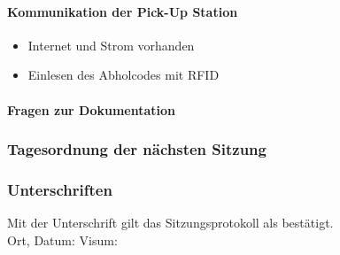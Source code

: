 \paragraph{Kommunikation der Pick-Up Station}
	\begin{itemize}
	\item Internet und Strom vorhanden
	\item Einlesen des Abholcodes mit RFID
\end{itemize}

\paragraph{Fragen zur Dokumentation}
\subsubsection{Tagesordnung der nächsten Sitzung}

\subsubsection{Unterschriften}

Mit der Unterschrift gilt das Sitzungsprotokoll als bestätigt.\\

Ort, Datum:	\underline{\hspace*{6cm}}	\hspace*{1cm} Visum:	\underline{\hspace*{4cm}}


